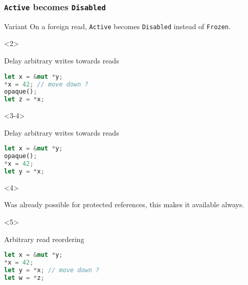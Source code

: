 \begin{frame}[fragile, t]
    \frametitle{\texttt{Active} becomes \texttt{Disabled}}

    \begin{exampleblock}{Variant}
        On a foreign read, \texttt{Active} becomes \texttt{Disabled} instead of \texttt{Frozen}.
    \end{exampleblock}


    \begin{onlyenv}<2>
        \begin{block}{{\cmark} Delay arbitrary writes towards reads}
            \begin{lstlisting}[language=rust, basicstyle=\ttfamily\scriptsize]
let x = &mut *y;
*x = 42; // move down ?
opaque();
let z = *x;
            \end{lstlisting}
        \end{block}
    \end{onlyenv}

    \begin{onlyenv}<3-4>
        \begin{block}{{\cmark} Delay arbitrary writes towards reads}
            \begin{lstlisting}[language=rust, basicstyle=\ttfamily\scriptsize]
let x = &mut *y;
opaque();
*x = 42;
let y = *x;
            \end{lstlisting}
        \end{block}
    \end{onlyenv}

    \begin{onlyenv}<4>
        \begin{block}{}
            Was already possible for protected references,
            this makes it available always.
        \end{block}
    \end{onlyenv}


    \begin{onlyenv}<5>
        \begin{block}{{\xmark} Arbitrary read reordering}
            \begin{lstlisting}[language=rust]
let x = &mut *y;
*x = 42;
let y = *x; // move down ?
let w = *z;
            \end{lstlisting}
        \end{block}
    \end{onlyenv}


\end{frame}
